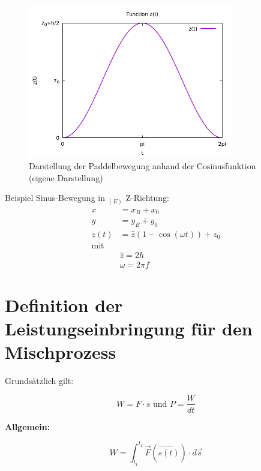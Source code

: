 \begin{figure}[h]
    \centering
    \includegraphics[width=0.8\textwidth]{bilder/cosine-plot_real.png}
    \caption[Darstellung der Paddelbewegung anhand der Cosinusfunktion]{Darstellung der Paddelbewegung anhand der Cosinusfunktion (eigene Darstellung)}\label{fig:PaddelbewegungCos}
\end{figure}




Beispiel Sinus-Bewegung in \( _{(E)}\) Z-Richtung:
\begin{equation}
    \begin{aligned}
        x &= x_B + x_0\\
        y &= y_B + y_0\\
        z(t) &= \hat{z}\left( 1 - \cos(\omega t) \right) +z_0\\
        \text{mit}\\
        &\hat{z} = 2h\\
        &\omega = 2\pi f
    \end{aligned}
\end{equation}

\section{Definition der Leistungseinbringung für den Mischprozess}

Grundsätzlich gilt:

\begin{equation}
    W = F \cdot s \text{   und   } P = \frac{W}{dt}
\end{equation}

\textbf{Allgemein:}

\begin{equation}
    W = \int_{t_1}^{t_2} \vec{F}(\vec{s(t)})\cdot d \vec{s}
\end{equation}

